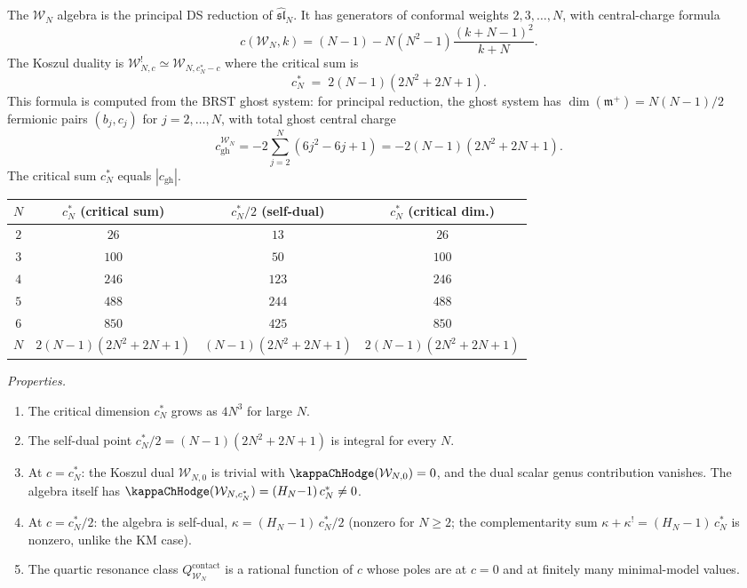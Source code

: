 \begin{computation}
The $\mathcal{W}_N$ algebra is the principal DS reduction of
$\widehat{\mathfrak{sl}}_N$.
It has generators of conformal weights $2, 3, \dots, N$, with
central-charge formula
\[
c(\mathcal{W}_N, k)
= (N-1) - N(N^2-1)\frac{(k+N-1)^2}{k+N}.
\]
The Koszul duality is
$\mathcal{W}_{N,c}^! \simeq \mathcal{W}_{N,c_N^*-c}$
where the critical sum is
\begin{equation}%
c_N^* \;=\; 2(N-1)(2N^2 + 2N + 1).
\end{equation}
This formula is computed from the BRST ghost system:
for principal reduction, the ghost system has
$\dim(\mathfrak{m}^+) = N(N-1)/2$ fermionic pairs
$(b_j, c_j)$ for $j = 2, \dots, N$, with total ghost
central charge
\[
c_{\mathrm{gh}}^{\mathcal{W}_N}
= -2\sum_{j=2}^{N}(6j^2 - 6j + 1)
= -2(N-1)(2N^2 + 2N + 1).
\]
The critical sum $c_N^*$ equals $|c_{\mathrm{gh}}|$.

\begin{center}
\renewcommand{\arraystretch}{1.3}
\begin{tabular}{cccc}
$N$ & $c_N^*$ (critical sum) & $c_N^*/2$ (self-dual) &
$c_N^*$ (critical dim.) \\
\hline
$2$ & $26$ & $13$ & $26$ \\
$3$ & $100$ & $50$ & $100$ \\
$4$ & $246$ & $123$ & $246$ \\
$5$ & $488$ & $244$ & $488$ \\
$6$ & $850$ & $425$ & $850$ \\
$N$ & $2(N{-}1)(2N^2{+}2N{+}1)$ & $(N{-}1)(2N^2{+}2N{+}1)$ &
$2(N{-}1)(2N^2{+}2N{+}1)$
\end{tabular}
\end{center}

\emph{Properties.}
\begin{enumerate}[label=\textup{(\roman*)}]
\item The critical dimension $c_N^*$ grows as $4N^3$ for
 large $N$.
\item The self-dual point
 \(c_N^*/2=(N-1)(2N^2+2N+1)\) is integral for every \(N\).
\item At $c = c_N^*$: the Koszul dual $\mathcal{W}_{N,0}$
 is trivial with $\kappaChHodge(\mathcal{W}_{N,0}) = 0$, and
 the dual scalar genus contribution vanishes. The algebra itself
 has $\kappaChHodge(\mathcal{W}_{N,c_N^*}) = (H_N{-}1)\,c_N^* \neq 0$.
\item At $c = c_N^*/2$: the algebra is self-dual,
 $\kappa = (H_N{-}1)\,c_N^*/2$ (nonzero for $N \ge 2$;
 the complementarity sum $\kappa + \kappa^! = (H_N{-}1)\,c_N^*$
 is nonzero, unlike the KM case).
\item The quartic resonance class
 $Q^{\mathrm{contact}}_{\mathcal{W}_N}$ is a rational
 function of $c$ whose poles are at $c = 0$ and at
 finitely many minimal-model values.
\end{enumerate}
\end{computation}

